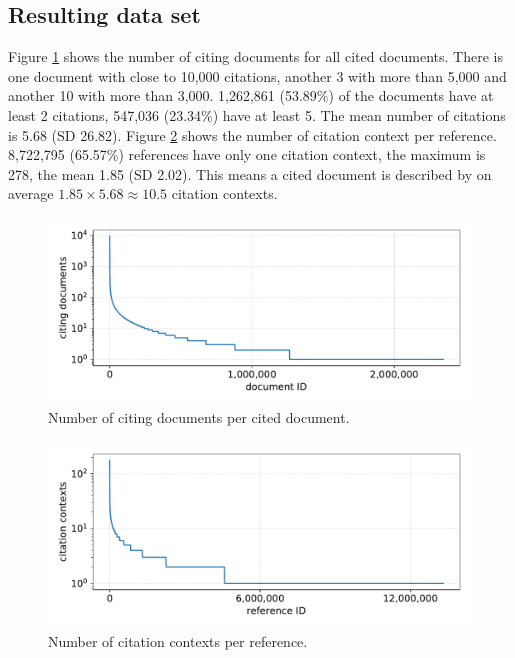\subsection{Resulting data set}

Figure \ref{fig:numcitdoc} shows the number of citing documents for all cited documents. There is one document with close to 10,000 citations, another 3 with more than 5,000 and another 10 with more than 3,000. 1,262,861 (53.89\%) of the documents have at least 2 citations, 547,036 (23.34\%) have at least 5. The mean number of citations is 5.68 (SD 26.82). Figure \ref{fig:numcontref} shows the number of citation context per reference. 8,722,795 (65.57\%) references have only one citation context, the maximum is 278, the mean 1.85 (SD 2.02). This means a cited document is described by on average $1.85 \times 5.68 \approx 10.5$ citation contexts.

\begin{figure}[tb]
  \centering
  \includegraphics[width=\linewidth]{figures/dataset/citing_docs_per_cited_doc.pdf}
  \caption{Number of citing documents per cited document.}
  \label{fig:numcitdoc}
\end{figure}

\begin{figure}[tb]
  \centering
  \includegraphics[width=\linewidth]{figures/dataset/citation_contexts_per_reference.pdf}
  \caption{Number of citation contexts per reference.}
  \label{fig:numcontref}
\end{figure}

